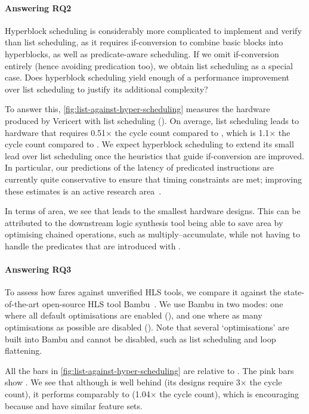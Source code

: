 \paragraph{Answering RQ2}
Hyperblock scheduling is considerably more complicated to implement and verify than list scheduling, as it requires if-conversion to combine basic blocks into hyperblocks, as well as predicate-aware scheduling. If we omit if-conversion entirely (hence avoiding predication too), we obtain list scheduling as a special case. Does hyperblock scheduling yield enough of a performance improvement over list scheduling to justify its additional complexity?

To answer this, \cref{fig:list-against-hyper-scheduling} measures the hardware produced by Vericert with list scheduling (\VericertList{}). On average, list scheduling leads to hardware that requires 0.51$\times$ the cycle count compared to \VericertBase{}, which is 1.1$\times$ the cycle count compared to \VericertHyper{}. We expect hyperblock scheduling to extend its small lead over list scheduling once the heuristics that guide if-conversion are improved.  In particular, our predictions of the latency of predicated instructions are currently quite conservative to ensure that timing constraints are met; improving these estimates is an active research area~\cite{tan15_mappin_lut_fpgas,rizzi23_iterat_method_mappin_aware_frequen,wang23_mapbuf,ustun20_accur_fpga_hls,zheng14_fast_effec_placem_routin_direc}.

In terms of area, we see that \VericertList{} leads to the smallest hardware designs. This can be attributed to the downstream logic synthesis tool being able to save area by optimising chained operations, such as multiply--accumulate, while not having to handle the predicates that are introduced with \VericertHyper{}.

\paragraph{Answering RQ3}
To assess how \VericertHyper{} fares against unverified HLS tools, we compare it against the state-of-the-art open-source HLS tool Bambu~\cite[]{ferrandi21_bambu}. We use Bambu in two modes: one where all default optimisations are enabled (\BambuDefault{}), and one where as many optimisations as possible are disabled (\BambuNoOpt{}). Note that several `optimisations' are built into Bambu and cannot be disabled, such as list scheduling and loop flattening.

All the bars in \cref{fig:list-against-hyper-scheduling} are relative to \BambuDefault. The pink bars show \BambuNoOpt. We see that although \VericertHyper{} is well behind \BambuDefault{} (its designs require 3$\times$ the cycle count), it performs comparably to \BambuNoOpt{} (1.04$\times$ the cycle count), which is encouraging because \VericertHyper{} and \BambuNoOpt{} have similar feature sets.

